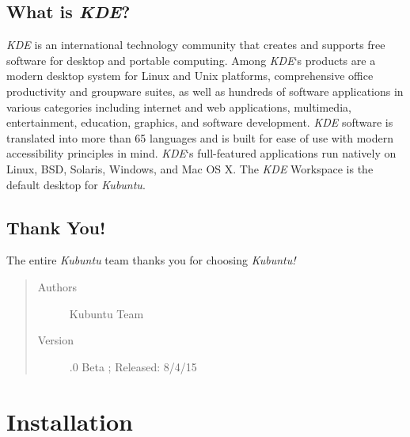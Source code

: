 \documentclass[letterpaper,10pt,english]{sphinxmanual}
\begin{document}
\section{What is \emph{KDE}?}
\label{welcome:what-is-kde}
\emph{KDE} is an international technology community that creates and supports free software for desktop and portable computing. Among \emph{KDE}`s products are a modern desktop system for Linux and Unix platforms, comprehensive office productivity and groupware suites, as well as hundreds of software applications in various categories including internet and web applications, multimedia, entertainment, education, graphics, and software development. \emph{KDE} software is translated into more than 65 languages and is built for ease of use with modern accessibility principles in mind. \emph{KDE}`s full-featured applications run natively on Linux, BSD, Solaris, Windows, and Mac OS X. The \emph{KDE} Workspace is the default desktop for \emph{Kubuntu}.


\section{Thank You!}
\label{welcome:thank-you}
The entire \emph{Kubuntu} team thanks you for choosing \emph{Kubuntu!}
\begin{quote}\begin{description}
\item[{Authors}] \leavevmode
Kubuntu Team

\item[{Version}] .0 Beta ; Released: 8/4/15

\end{description}\end{quote}


\chapter{Installation}
\label{docs/installation:installation}\label{docs/installation::doc}
\end{document}

